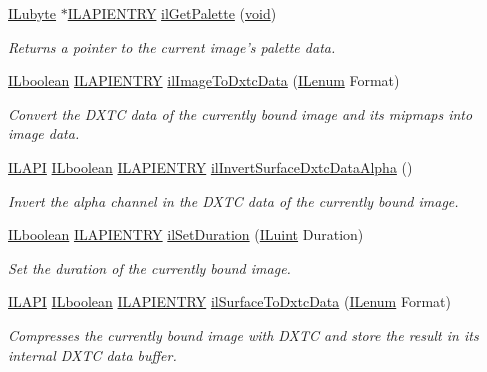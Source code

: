 \begin{DoxyCompactItemize}
\hyperlink{group__il__types_ga057357939bc5a12e8061715453568519}{I\+Lubyte} $\ast$\hyperlink{_i_l_8h_a69c08a8d06df986f7e46f209d131ef2f}{I\+L\+A\+P\+I\+E\+N\+T\+R\+Y} \hyperlink{group__data_gaffc60ac194afa1ed9d1bdc266adc5d29}{il\+Get\+Palette} (\hyperlink{_i_l_8h_a5530e04d947bcddd83639ea7940faf10}{void})
\begin{DoxyCompactList}\small\item\em Returns a pointer to the current image's palette data. \end{DoxyCompactList}\item 
\hyperlink{group__il__types_gaa6aa7c95cfdc06b4d8601ef832b7bb0a}{I\+Lboolean} \hyperlink{_i_l_8h_a69c08a8d06df986f7e46f209d131ef2f}{I\+L\+A\+P\+I\+E\+N\+T\+R\+Y} \hyperlink{group__data_gaa7c7b55455ab5af387502a4cf4ede91f}{il\+Image\+To\+Dxtc\+Data} (\hyperlink{group__il__types_ga62ca73445716183ef42b1f3906a45ed0}{I\+Lenum} Format)
\begin{DoxyCompactList}\small\item\em Convert the D\+X\+T\+C data of the currently bound image and its mipmaps into image data. \end{DoxyCompactList}\item 
\hyperlink{_i_l_8h_aedb0c8b2b033d0612e3d784d2f598758}{I\+L\+A\+P\+I} \hyperlink{group__il__types_gaa6aa7c95cfdc06b4d8601ef832b7bb0a}{I\+Lboolean} \hyperlink{_i_l_8h_a69c08a8d06df986f7e46f209d131ef2f}{I\+L\+A\+P\+I\+E\+N\+T\+R\+Y} \hyperlink{group__data_ga895ded17dd75715105a64dddb78f9790}{il\+Invert\+Surface\+Dxtc\+Data\+Alpha} ()
\begin{DoxyCompactList}\small\item\em Invert the alpha channel in the D\+X\+T\+C data of the currently bound image. \end{DoxyCompactList}\item 
\hyperlink{group__il__types_gaa6aa7c95cfdc06b4d8601ef832b7bb0a}{I\+Lboolean} \hyperlink{_i_l_8h_a69c08a8d06df986f7e46f209d131ef2f}{I\+L\+A\+P\+I\+E\+N\+T\+R\+Y} \hyperlink{group__data_gaf4733214806d616fb5a58662878b880f}{il\+Set\+Duration} (\hyperlink{group__il__types_gaff8e86a1072c8d7cfe387fb87c6ed8e1}{I\+Luint} Duration)
\begin{DoxyCompactList}\small\item\em Set the duration of the currently bound image. \end{DoxyCompactList}\item 
\hyperlink{_i_l_8h_aedb0c8b2b033d0612e3d784d2f598758}{I\+L\+A\+P\+I} \hyperlink{group__il__types_gaa6aa7c95cfdc06b4d8601ef832b7bb0a}{I\+Lboolean} \hyperlink{_i_l_8h_a69c08a8d06df986f7e46f209d131ef2f}{I\+L\+A\+P\+I\+E\+N\+T\+R\+Y} \hyperlink{group__data_ga9fdc29fee3450b319f3a6e3b3f86af8a}{il\+Surface\+To\+Dxtc\+Data} (\hyperlink{group__il__types_ga62ca73445716183ef42b1f3906a45ed0}{I\+Lenum} Format)
\begin{DoxyCompactList}\small\item\em Compresses the currently bound image with D\+X\+T\+C and store the result in its internal D\+X\+T\+C data buffer. \end{DoxyCompactList}\end{DoxyCompactItemize}


